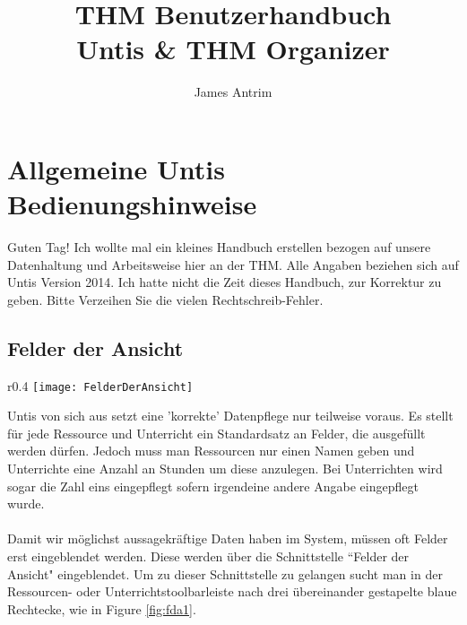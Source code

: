 \documentclass[]{report}
\title{THM Benutzerhandbuch \\Untis \& THM Organizer}
\author{James Antrim}
\begin{document}
\maketitle

\newpage
\thispagestyle{empty}
\section*{}

\newpage
\tableofcontents
\thispagestyle{empty}

\newpage
\setcounter{page}{1}
\chapter{Allgemeine Untis Bedienungshinweise}

Guten Tag! Ich wollte mal ein kleines Handbuch erstellen bezogen auf unsere Datenhaltung und Arbeitsweise hier an der THM. Alle Angaben beziehen sich auf Untis Version 2014. Ich hatte nicht die Zeit dieses Handbuch, zur Korrektur zu geben. Bitte Verzeihen Sie die vielen Rechtschreib-Fehler.



\section{Felder der Ansicht}

\begin{wrapfigure}{r}{0.4\textwidth}
	\vspace{-15pt}
	\texttt{[image: FelderDerAnsicht]}
	\vspace{-5pt}
	\caption{Felder der Ansicht Icon}
	\label{fig:fda1}
\end{wrapfigure}
Untis von sich aus setzt eine 'korrekte' Datenpflege nur teilweise voraus. Es stellt für jede Ressource und Unterricht ein Standardsatz an Felder, die ausgefüllt werden dürfen. Jedoch muss man Ressourcen nur einen Namen geben und Unterrichte eine Anzahl an Stunden um diese anzulegen. Bei Unterrichten wird sogar die Zahl eins eingepflegt sofern irgendeine andere Angabe eingepflegt wurde.\\
\\
Damit wir möglichst aussagekräftige Daten haben im System, müssen oft Felder erst eingeblendet werden. Diese werden über die Schnittstelle ``Felder der Ansicht" eingeblendet. Um zu dieser Schnittstelle zu gelangen sucht man in der Ressourcen- oder Unterrichtstoolbarleiste nach drei übereinander gestapelte blaue Rechtecke, wie in Figure \ref{fig:fda1}.
\end{document}
